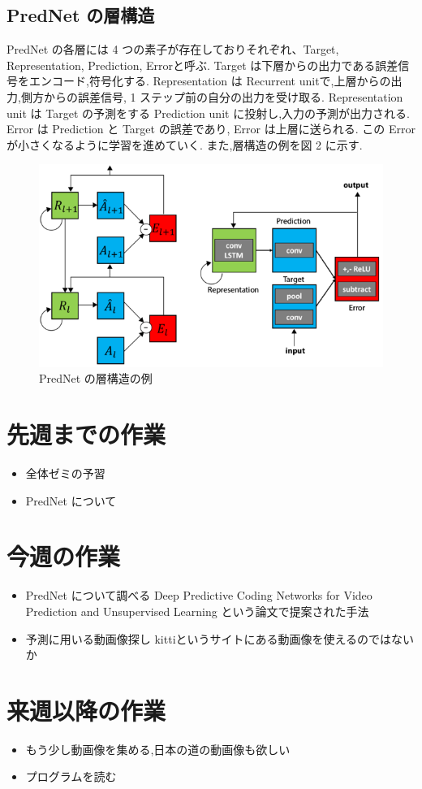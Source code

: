 \subsection{PredNet の層構造}
PredNet の各層には 4 つの素子が存在しておりそれぞれ、Target, Representation, Prediction, Errorと呼ぶ.
Target は下層からの出力である誤差信号をエンコード,符号化する.
Representation は Recurrent unitで,上層からの出力,側方からの誤差信号, 1 ステップ前の自分の出力を受け取る.
Representation unit は Target の予測をする Prediction unit に投射し,入力の予測が出力される.
Error は Prediction と Target の誤差であり, Error は上層に送られる.
この Error が小さくなるように学習を進めていく.
また,層構造の例を図 2 に示す.

 \begin{figure}[hb]
\includegraphics[scale=0.4]{prednet.png}
 \caption{PredNet の層構造の例}
\end{figure}

\section{先週までの作業}
\begin{itemize}
          \item 全体ゼミの予習
          \item PredNet について
          
\end{itemize}

\section{今週の作業}
\begin{itemize}
          \item PredNet について調べる
          Deep Predictive Coding Networks for Video Prediction and Unsupervised Learning
          という論文で提案された手法
           \item  予測に用いる動画像探し
         kittiというサイトにある動画像を使えるのではないか
\end{itemize}

\section{来週以降の作業}
\begin{itemize}
          \item もう少し動画像を集める,日本の道の動画像も欲しい
          \item プログラムを読む
\end{itemize}





